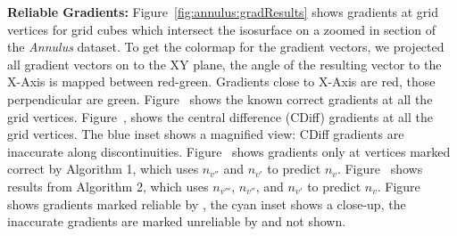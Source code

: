 \textbf{Reliable Gradients:}
Figure~\ref{fig:annulus:gradResults} shows gradients at grid vertices for grid cubes which intersect the isosurface on a zoomed in section of the \textit{Annulus} dataset.
To get the colormap for the gradient vectors, we projected all gradient vectors on to the XY plane, the angle of the resulting vector to the X-Axis is mapped between red-green. Gradients close to X-Axis are red, those perpendicular are green. 
Figure~\protect{} shows the known correct gradients at all the grid vertices.  Figure~, shows the central difference (CDiff) gradients at all the grid vertices. The blue inset shows a magnified view: CDiff gradients are inaccurate along discontinuities.
Figure~ shows gradients only at vertices marked correct by Algorithm 1,  which uses $n_{v''}$ and $n_{v'}$ to predict $n_v$. Figure~\protect{} shows results from Algorithm 2, which uses $n_{v'''}$, $n_{v''}$, and $n_{v'}$ to predict $n_v$. 
Figure~ shows gradients marked reliable by \protect\ReliGrad, the cyan inset shows a close-up, the inaccurate gradients are marked unreliable  by \ReliGrad and not shown. 

